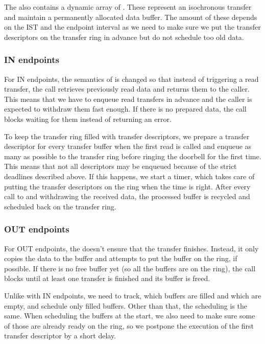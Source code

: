 The  also contains a dynamic array of
. These represent an isochronous transfer and
maintain a permanently allocated data buffer. The amount of these depends on
the IST and the endpoint interval as we need to make sure we put the transfer
descriptors on the transfer ring in advance but do not schedule too old data.

\subsubsection{IN endpoints}

For IN endpoints, the semantics of  is changed so that instead
of triggering a read transfer, the call retrieves previously read data and
returns them to the caller. This means that we have to enqueue read transfers
in advance and the caller is expected to withdraw them fast enough. If there is
no prepared data, the call blocks waiting for them instead of returning an
error.

To keep the transfer ring filled with transfer descriptors, we prepare a
transfer descriptor for every transfer buffer when the first read is called and
enqueue as many as possible to the transfer ring before ringing the doorbell
for the first time. This means that not all descriptors may be enqueued because
of the strict deadlines described above. If this happens, we start a timer,
which takes care of putting the transfer descriptors on the ring when the time
is right. After every call to  and withdrawing the received data,
the processed buffer is recycled and scheduled back on the transfer ring.

\subsubsection{OUT endpoints}

For OUT endpoints, the  doesn't ensure that the transfer
finishes. Instead, it only copies the data to the buffer and attempts to put
the buffer on the ring, if possible. If there is no free buffer yet (so all the
buffers are on the ring), the call blocks until at least one transfer is
finished and its buffer is freed.

Unlike with IN endpoints, we need to track, which buffers are filled and which
are empty, and schedule only filled buffers. Other than that, the scheduling is
the same. When scheduling the buffers at the start, we also need to make sure
some of those are already ready on the ring, so we postpone the execution of
the first transfer descriptor by a short delay.

